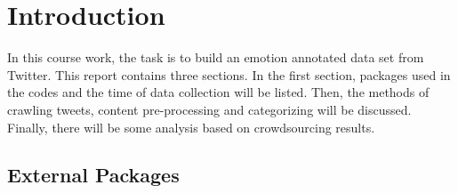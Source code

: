 \section{Introduction}

In this course work, the task is to build an emotion	annotated data set from Twitter. This report contains three sections. In the first section, packages used in the codes and the time of data collection will be listed. Then, the methods of crawling tweets, content pre-processing and categorizing will be discussed. Finally, there will be some analysis based on crowdsourcing results.

\subsection{External Packages}
